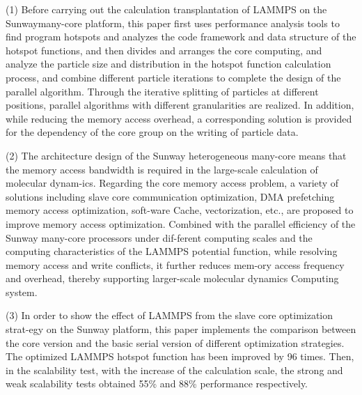 \begin{abstract*}
(1) Before carrying out the calculation transplantation of LAMMPS on the Sunwaymany-core platform, this paper first uses performance analysis tools to find program hotspots and analyzes the code framework and data structure of the hotspot functions, and then divides and arranges the core computing, and analyze the particle size and distribution in the hotspot function calculation process, and combine different particle iterations to complete the design of the parallel algorithm. Through the iterative splitting of particles at different positions, parallel algorithms with different granularities are realized. In addition, while reducing the memory access overhead, a corresponding solution is provided for the dependency of the core group on the writing of particle data.

(2) The architecture design of the Sunway heterogeneous many-core means that the memory access bandwidth is required in the large-scale calculation of molecular dynam-ics. Regarding the core memory access problem, a variety of solutions including slave core communication optimization, DMA prefetching memory access optimization, soft-ware Cache, vectorization, etc., are proposed to improve memory access optimization. Combined with the parallel efficiency of the Sunway many-core processors under dif-ferent computing scales and the computing characteristics of the LAMMPS potential function, while resolving memory access and write conflicts, it further reduces mem-ory access frequency and overhead, thereby supporting larger-scale molecular dynamics Computing system.

(3) In order to show the effect of LAMMPS from the slave core optimization strat-egy on the Sunway platform, this paper implements the comparison between the core version and the basic serial version of different optimization strategies. The optimized LAMMPS hotspot function has been improved by 96 times. Then, in the scalability test, with the increase of the calculation scale, the strong and weak scalability tests obtained 55\% and 88\% performance respectively.
\end{abstract*}
